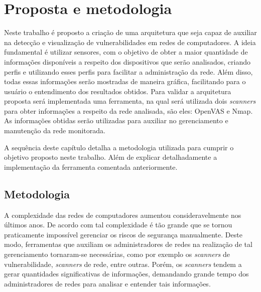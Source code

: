 \chapter{Proposta e metodologia}
\label{cap:proposta}
Neste trabalho é proposto a criação de uma arquitetura que seja capaz de auxiliar na detecção e visualização de vulnerabilidades em redes de computadores. A ideia fundamental é utilizar sensores, com o objetivo de obter a maior quantidade de informações disponíveis a respeito dos dispositivos que serão analisados, criando perfis e utilizando esses perfis para facilitar a administração da rede. Além disso, todas essas informações serão mostradas de maneira gráfica, facilitando para o usuário o entendimento dos resultados obtidos. Para validar a arquitetura proposta será implementada uma ferramenta, na qual será utilizada dois \textit{scanners} para obter informações a respeito da rede analisada, são eles: \gls{OpenVAS} e \gls{Nmap}. As informações obtidas serão utilizadas para auxiliar no gerenciamento e manutenção da rede monitorada. 

A sequência deste capítulo detalha a metodologia utilizada para cumprir o objetivo proposto neste trabalho. Além de explicar detalhadamente a implementação da ferramenta comentada anteriormente.
\section{Metodologia}
A complexidade das redes de computadores aumentou consideravelmente nos últimos anos. De acordo com  tal complexidade é tão grande que se tornou praticamente impossível gerenciar os riscos de segurança manualmente. Deste modo, ferramentas que auxiliam os administradores de redes na realização de tal gerenciamento tornaram-se necessárias, como por exemplo os \textit{scanners} de vulnerabilidade, \textit{scanners} de rede, entre outras. Porém, os \textit{scanners} tendem a gerar quantidades significativas  de informações, demandando grande tempo dos administradores de redes para analisar e entender tais informações.

